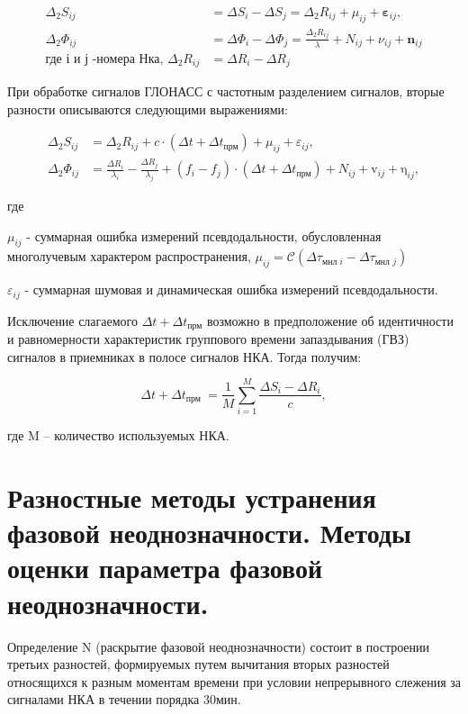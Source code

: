 \documentclass[14pt,a4paper,oneside]{extarticle}
\begin{document}
\[\begin{aligned}\Delta_2S_{ij}&=\Delta S_i-\Delta S_j=\Delta_2R_{ij}+\mu_{ij}+\boldsymbol{\varepsilon}_{ij},\\\Delta_2\Phi_{ij}&=\Delta\Phi_i-\Delta\Phi_j=\frac{\Delta_2R_{ij}}\lambda+N_{ij}+\nu_{ij}+\boldsymbol{n}_{ij}\\\text{где і и ј -номера Нка, }\Delta_2R_{ij}&=\Delta R_i-\Delta R_j\end{aligned}\]

При обработке сигналов ГЛОНАСС с частотным разделением сигналов, вторые разности описываются следующими выражениями:

\[\begin{aligned}\Delta_2S_{ij}&=\Delta_2R_{ij}+c\cdot(\Delta t+\Delta t_{\text{прм}} ) + \mu _ { i j }+\varepsilon_{ij},\\\Delta_2\Phi_{ij}&=\frac{\Delta R_i}{\lambda_i}-\frac{\Delta R_j}{\lambda_j}+(f_i-f_j)\cdot(\Delta t+\Delta t_{\text{прм}}) + N _ { i j }+\mathrm{v}_{ij}+\mathrm{\eta}_{ij},\end{aligned}\]

где

$\mu_{ij}$ - суммарная ошибка измерений псевдодальности, обусловленная многолучевым характером распространения, $\mu_{ij}=\mathcal{C}\left(\Delta\tau_{\textit{мнл }i}-\Delta\tau_{\text{мнл }j}\right)$

$\varepsilon_{ij}$ - суммарная шумовая и динамическая ошибка измерений псевдодальности.

Исключение слагаемого $\Delta t+\Delta t_{\text{прм}}$ возможно в предположение об идентичности и равномерности характеристик группового времени запаздывания (ГВЗ) сигналов в приемниках в полосе сигналов НКА. Тогда получим:

\[\Delta t+\Delta t_\text{прм }=\frac1M\sum_{i=1}^M\frac{\Delta S_i-\Delta R_i}c,\]

где M – количество используемых НКА.

\section{Разностные методы устранения фазовой неоднозначности. Методы оценки параметра фазовой неоднозначности.}

Определение N (раскрытие фазовой неоднозначности) состоит в построении третьих разностей, формируемых путем вычитания вторых разностей относящихся к разным моментам времени при условии непрерывного слежения за сигналами НКА в течении порядка 30мин.
\end{document}
